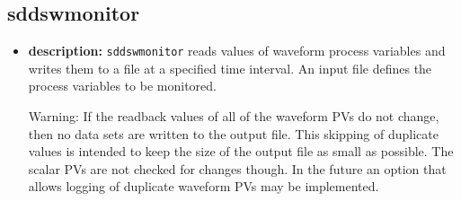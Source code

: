 %
%
\begin{latexonly}
\newpage
\end{latexonly}

%
%
\subsection{sddswmonitor}
\label{sddswmonitor}

\begin{itemize}
\item {\bf description:}
%
%
\verb+sddswmonitor+ reads values of waveform process variables 
and writes them to a file at a specified time interval.
An input file defines the process variables to be monitored.

Warning: If the readback values of all of the waveform PVs do not
change, then no data sets are written to the output file. This
skipping of duplicate values is intended to keep the size of the
output file as small as possible.  The scalar PVs are not checked for
changes though. In the future an option that allows logging of duplicate
waveform PVs may be implemented.


\end{itemize}
